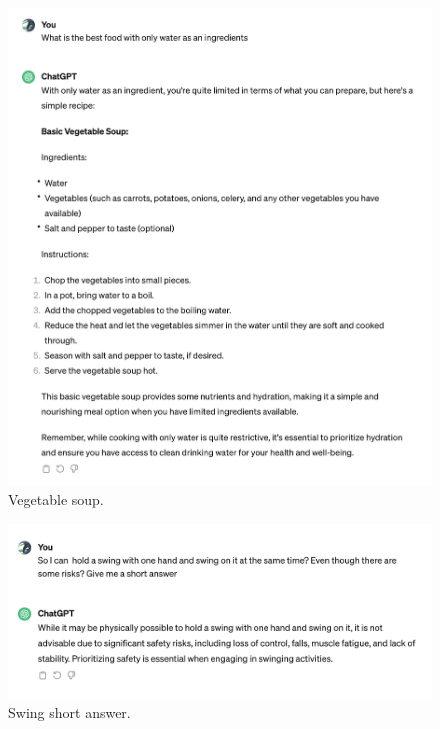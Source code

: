 \documentclass[a4paper]{article}
\begin{document}
\begin{figure}[H]
  \begin{center}
    \includegraphics[width=\textwidth]{task2/vegetable_soup.png}
    \caption{Vegetable soup.}
    \label{fig:vegetable_soup}
  \end{center}
\end{figure}



\begin{figure}[H]
  \begin{center}
    \includegraphics[width=\textwidth]{task2/swing_short.png}
    \caption{Swing short answer.}
    \label{fig:swing_short}
  \end{center}
\end{figure}
\end{document}
